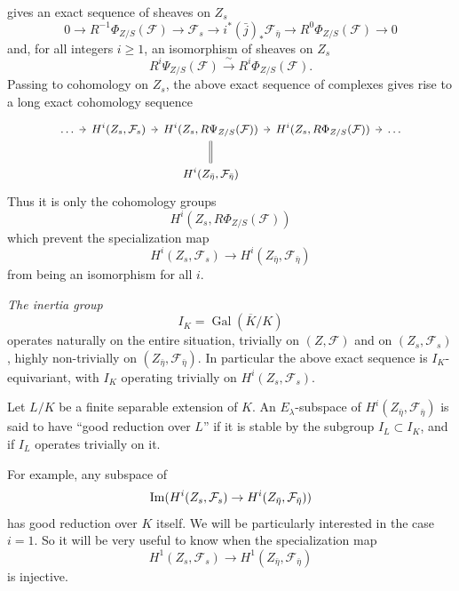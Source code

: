 gives an exact sequence of sheaves on $Z_s$
\begin{equation}\label{eq:14.1.2.8}
0 \to R^{-1}\Phi_{Z/S}(\mathcal{F}) \to \mathcal{F}_s \to i^*(\bar{j})_* \mathcal{F}_{\bar{\eta}} \to R^0 \Phi_{Z/S}(\mathcal{F}) \to 0
\end{equation}
and, for all integers $i \ge 1$, an isomorphism of sheaves on $Z_s$
\begin{equation}\label{eq:14.1.2.9}
R^i \Psi_{Z/S}(\mathcal{F}) \xrightarrow{\ \sim\ } R^i \Phi_{Z/S}(\mathcal{F}) .
\end{equation}
Passing to cohomology on $Z_s$, the above exact sequence of complexes gives rise to a long exact cohomology sequence
\begin{equation}\label{eq:14.1.2.10}
\begin{tikzcd}[column sep=0.55em, font=\small]
\dots \arrow[r] & H^i(Z_s, \mathcal{F}_s) \arrow[r] & H^i(Z_s, R\Psi_{Z/S}(\mathcal{F})) \arrow[r] \arrow[d, equal] & H^i(Z_s, R\Phi_{Z/S}(\mathcal{F})) \arrow[r] & \dots \\
& & H^i(Z_{\bar{\eta}}, \mathcal{F}_{\bar{\eta}}) & &
\end{tikzcd}
\end{equation}
Thus it is only the cohomology groups
\begin{equation}\label{eq:14.1.2.11}
H^i(Z_s, R\Phi_{Z/S}(\mathcal{F}))
\end{equation}
which prevent the specialization map
\begin{equation}\label{eq:14.1.2.12}
H^i(Z_s, \mathcal{F}_s) \to H^i(Z_{\bar{\eta}}, \mathcal{F}_{\bar{\eta}})
\end{equation}
from being an isomorphism for all $i$.

\kmitem\label{item:14.1.3}\emph{The inertia group}
\[
I_K = \operatorname{Gal}(\overline{K}/K)
\]
operates naturally on the entire situation, trivially on $(Z, \mathcal{F})$ and on $(Z_s, \mathcal{F}_s)$, highly non-trivially on $(Z_{\bar{\eta}}, \mathcal{F}_{\bar{\eta}})$. In particular the above exact sequence is $I_K$-equivariant, with $I_K$ operating trivially on $H^i(Z_s, \mathcal{F}_s)$.

\begin{definition}\label{def:14.1.4}
Let $L/K$ be a finite separable extension of $K$. An $E_\lambda$-subspace of $H^i(Z_{\bar{\eta}}, \mathcal{F}_{\bar{\eta}})$ is said to have ``good reduction over $L$'' if it is stable by the subgroup $I_L \subset I_K$, and if $I_L$ operates trivially on it.
\par
For example, any subspace of
\[
\operatorname{Im}(H^i(Z_s, \mathcal{F}_s) \to H^i(Z_{\bar{\eta}}, \mathcal{F}_{\bar{\eta}}))
\]
has good reduction over $K$ itself. We will be particularly interested in the case $i = 1$. So it will be very useful to know when the specialization map
\[
H^1(Z_s, \mathcal{F}_s) \to H^1(Z_{\bar{\eta}}, \mathcal{F}_{\bar{\eta}})
\]
is injective.
\end{definition}

